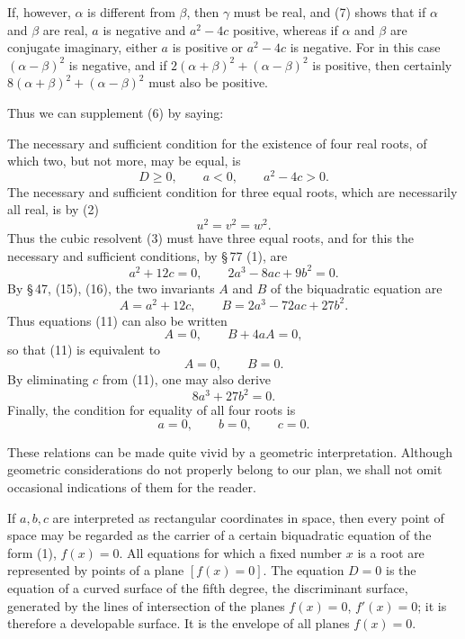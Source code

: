 \documentclass[11pt]{article}
\begin{document}
If, however, $\alpha$ is different from $\beta$, then $\gamma$ must be real, and (7) shows that if $\alpha$ and $\beta$ are real, $a$ is negative and $a^2-4c$ positive, whereas if $\alpha$ and $\beta$ are conjugate imaginary, either $a$ is positive or $a^2-4c$ is negative. For in this case $(\alpha-\beta)^2$ is negative, and if $2(\alpha+\beta)^2+(\alpha-\beta)^2$ is positive, then certainly $8(\alpha+\beta)^2+(\alpha-\beta)^2$ must also be positive.

Thus we can supplement (6) by saying:

The necessary and sufficient condition for the existence of four real roots, of which two, but not more, may be equal, is
\begin{equation}
        D\geq 0,
        \qquad a<0,
        \qquad a^2-4c>0.
\tag{10}
\end{equation}
The necessary and sufficient condition for three equal roots, which are necessarily all real, is by (2)
\[
        u^2=v^2=w^2.
\]
Thus the cubic resolvent (3) must have three equal roots, and for this the necessary and sufficient conditions, by \S\,77 (1), are
\begin{equation}
        a^2+12c=0,
        \qquad
        2a^3-8ac+9b^2=0.
\tag{11}
\end{equation}
By \S\,47, (15), (16), the two invariants $A$ and $B$ of the biquadratic equation are
\[
        A=a^2+12c,
        \qquad
        B=2a^3-72ac+27b^2.
\]
Thus equations (11) can also be written
\[
        A=0,
        \qquad B+4aA=0,
\]
so that (11) is equivalent to
\[
        A=0,
        \qquad B=0.
\]
By eliminating $c$ from (11), one may also derive
\begin{equation}
        8a^3+27b^2=0.
\tag{12}
\end{equation}
Finally, the condition for equality of all four roots is
\begin{equation}
        a=0,
        \qquad b=0,
        \qquad c=0.
\tag{13}
\end{equation}

These relations can be made quite vivid by a geometric interpretation. Although geometric considerations do not properly belong to our plan, we shall not omit occasional indications of them for the reader.

If $a,b,c$ are interpreted as rectangular coordinates in space, then every point of space may be regarded as the carrier of a certain biquadratic equation of the form (1), $f(x)=0$. All equations for which a fixed number $x$ is a root are represented by points of a plane $[f(x)=0]$. The equation $D=0$ is the equation of a curved surface of the fifth degree, the discriminant surface, generated by the lines of intersection of the planes $f(x)=0$, $f'(x)=0$; it is therefore a developable surface. It is the envelope of all planes $f(x)=0$.
\end{document}
